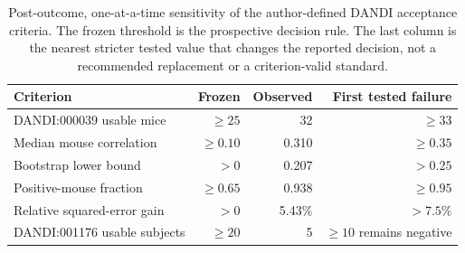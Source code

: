 \begin{table}[!htbp]
\centering
\caption{Post-outcome, one-at-a-time sensitivity of the author-defined DANDI acceptance criteria. The frozen threshold is the prospective decision rule. The last column is the nearest stricter tested value that changes the reported decision, not a recommended replacement or a criterion-valid standard.}
\label{tab:dandi-threshold-sensitivity}
\scriptsize
\renewcommand{\arraystretch}{1.02}
\begin{tabularx}{\textwidth}{@{}Y r r r@{}}
\toprule
Criterion & Frozen & Observed & First tested failure \\
\midrule
DANDI:000039 usable mice & $\geq25$ & 32 & $\geq33$ \\
Median mouse correlation & $\geq0.10$ & 0.310 & $\geq0.35$ \\
Bootstrap lower bound & $>0$ & 0.207 & $>0.25$ \\
Positive-mouse fraction & $\geq0.65$ & 0.938 & $\geq0.95$ \\
Relative squared-error gain & $>0$ & 5.43\% & $>7.5\%$ \\
DANDI:001176 usable subjects & $\geq20$ & 5 & $\geq10$ remains negative \\
\bottomrule
\end{tabularx}
\end{table}
